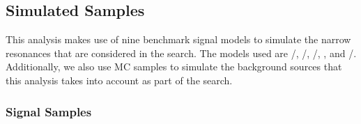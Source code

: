 %  
%
%  


\subsection{Simulated Samples}
\label{sec:simSamples}

This analysis makes use of nine benchmark signal models to simulate the narrow resonances that are considered in the search.
The models used are \ggF/\VBF\GBulktoWWtolnuqqbarpr, \ggF/\VBF\RadtoWWtolnuqqbarpr, \DY/\VBF\WprtoWZtolnuqqbar, \DY\WprtoWHtolnubbbar, and \DY/\VBF\ZprtoWWtolnuqqbarpr.
Additionally, we also use MC samples to simulate the background sources that this analysis takes into account as part of the search.

\subsubsection{Signal Samples}

